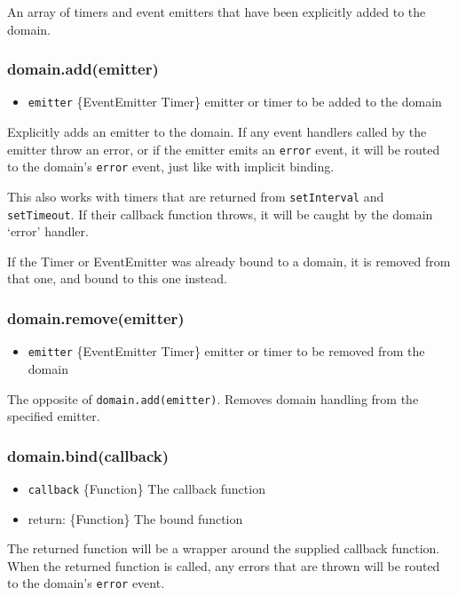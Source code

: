 An array of timers and event emitters that have been explicitly added to
the domain.

\subsubsection{domain.add(emitter)}

\begin{itemize}
\item
  \texttt{emitter} \{EventEmitter \textbar{} Timer\} emitter or timer to
  be added to the domain
\end{itemize}

Explicitly adds an emitter to the domain. If any event handlers called
by the emitter throw an error, or if the emitter emits an \texttt{error}
event, it will be routed to the domain's \texttt{error} event, just like
with implicit binding.

This also works with timers that are returned from \texttt{setInterval}
and \texttt{setTimeout}. If their callback function throws, it will be
caught by the domain `error' handler.

If the Timer or EventEmitter was already bound to a domain, it is
removed from that one, and bound to this one instead.

\subsubsection{domain.remove(emitter)}

\begin{itemize}
\item
  \texttt{emitter} \{EventEmitter \textbar{} Timer\} emitter or timer to
  be removed from the domain
\end{itemize}

The opposite of \texttt{domain.add(emitter)}. Removes domain handling
from the specified emitter.

\subsubsection{domain.bind(callback)}

\begin{itemize}
\item
  \texttt{callback} \{Function\} The callback function
\item
  return: \{Function\} The bound function
\end{itemize}

The returned function will be a wrapper around the supplied callback
function. When the returned function is called, any errors that are
thrown will be routed to the domain's \texttt{error} event.

